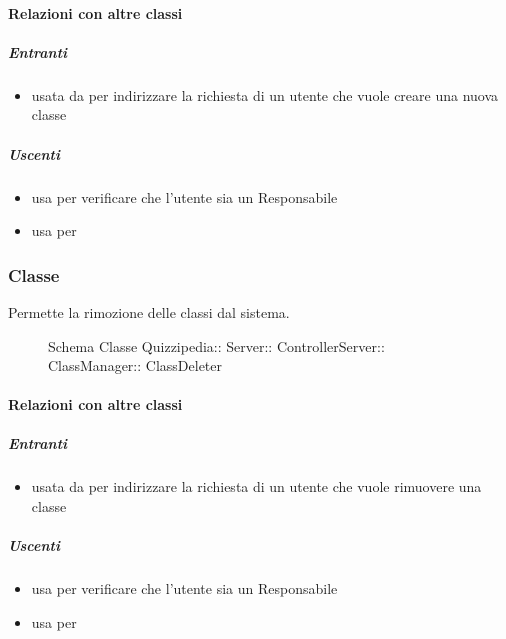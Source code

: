 \paragraph{Relazioni con altre classi}
\subparagraph{Entranti}
\begin{itemize}
\item usata da  per indirizzare la richiesta di un utente che vuole creare una nuova classe
\end{itemize}
\subparagraph{Uscenti}
\begin{itemize}
\item usa  per verificare che l'utente sia un Responsabile
\item usa  per 
\end{itemize}
\subsubsection{Classe }
Permette la rimozione delle classi dal sistema.
\begin{figure}[H]
\centering
\noindent{}
\caption[Schema Classe ClassDeleter]{Schema Classe Quizzipedia:: Server:: ControllerServer:: ClassManager:: ClassDeleter}
\end{figure}
\paragraph{Relazioni con altre classi}
\subparagraph{Entranti}
\begin{itemize}
\item usata da  per indirizzare la richiesta di un utente che vuole rimuovere una classe
\end{itemize}
\subparagraph{Uscenti}
\begin{itemize}
\item usa  per verificare che l'utente sia un Responsabile
\item usa  per 
\end{itemize}
